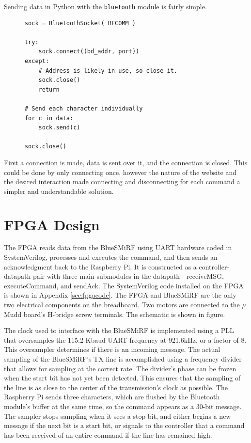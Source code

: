 \documentclass[12pt]{article}
\begin{document}
Sending data in Python with the \verb.bluetooth. module is fairly simple.

\begin{verbatim}
      sock = BluetoothSocket( RFCOMM )
  
      try:
          sock.connect((bd_addr, port))
      except:
          # Address is likely in use, so close it.
          sock.close()
          return
      
      # Send each character individually
      for c in data:
          sock.send(c)
      
      sock.close()
\end{verbatim}
First a connection is made, data is sent over it, and the connection is closed. This could be done by only connecting once, however the nature of the website and the desired interaction made connecting and disconnecting for each command a simpler and understandable solution.

\section{FPGA Design}

The FPGA reads data from the BlueSMiRF using UART hardware coded in SystemVerilog, processes and executes the command, and then sends an acknowledgment back to the Raspberry Pi.  It is constructed as a controller-datapath pair with three main submodules in the datapath - receiveMSG, executeCommand, and sendAck.  The SystemVerilog code installed on the FPGA is shown in Appendix \ref{sec:fpgacode}. The FPGA and BlueSMiRF are the only two electrical components on the breadboard. Two motors are connected to the $\mu$Mudd board's H-bridge screw terminals.  The schematic is shown in figure.

The clock used to interface with the BlueSMiRF is implemented using a PLL that oversamples the 115.2 Kbaud UART frequency at 921.6kHz, or a factor of 8.  This oversampler determines if there is an incoming message.  The actual sampling of the BlueSMiRF's TX line is accomplished using a frequency divider that allows for sampling at the correct rate.  The divider's phase can be frozen when the start bit has not yet been detected.  This ensures that the sampling of the line is as close to the center of the transmission's clock as possible.  The Raspberry Pi sends three characters, which are flushed by the Bluetooth module's buffer at the same time, so the command appears as a 30-bit message.  The sampler stops sampling when it sees a stop bit, and either begins a new message if the next bit is a start bit, or signals to the controller that a command has been received of an entire command if the line has remained high.
\end{document}
